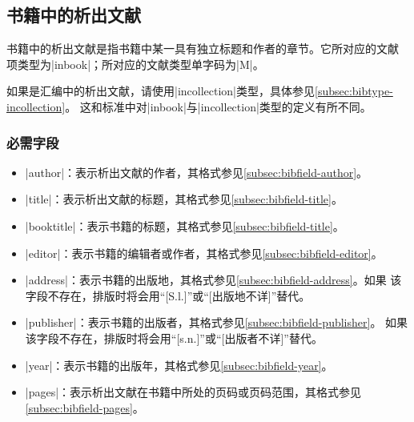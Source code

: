 
\subsection{书籍中的析出文献}\label{subsec:bibtype-inbook}

书籍中的析出文献是指书籍中某一具有独立标题和作者的章节。它所对应的{\BibTeX}文献
项类型为|inbook|；所对应的文献类型单字码为|M|\cite{gbt3469-1983}。

\begin{note}
如果是汇编中的析出文献，请使用|incollection|类型，具体参见\ref{subsec:bibtype-incollection}。
这和标准{\BibTeX}中对|inbook|与|incollection|类型的定义有所不同。
\end{note}

\subsubsection{必需字段}

\begin{itemize}
\item |author|：表示析出文献的作者，其格式参见\ref{subsec:bibfield-author}。
\item |title|：表示析出文献的标题，其格式参见\ref{subsec:bibfield-title}。
\item |booktitle|：表示书籍的标题，其格式参见\ref{subsec:bibfield-title}。
\item |editor|：表示书籍的编辑者或作者，其格式参见\ref{subsec:bibfield-editor}。
\item |address|：表示书籍的出版地，其格式参见\ref{subsec:bibfield-address}。如果
  该字段不存在，{\BibTeX}排版时将会用``[S.l.]''或``[出版地不详]''替代。
\item |publisher|：表示书籍的出版者，其格式参见\ref{subsec:bibfield-publisher}。
  如果该字段不存在，{\BibTeX}排版时将会用``[s.n.]''或``[出版者不详]''替代。
\item |year|：表示书籍的出版年，其格式参见\ref{subsec:bibfield-year}。
\item |pages|：表示析出文献在书籍中所处的页码或页码范围，其格式参见\ref{subsec:bibfield-pages}。
\end{itemize}

